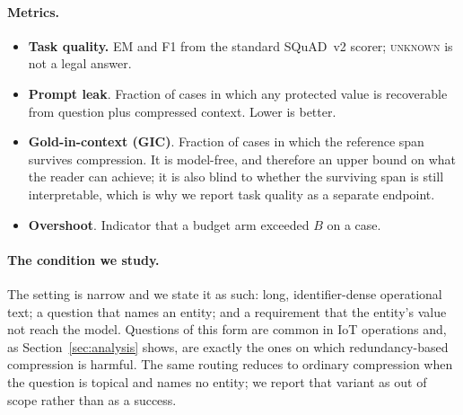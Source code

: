 \paragraph{Metrics.}
\begin{itemize}
\item \textbf{Task quality.} EM and F1 from the standard SQuAD~v2 scorer;
\textsc{unknown} is not a legal answer.
\item \textbf{Prompt leak}. Fraction of cases in which any protected value is recoverable
from question plus compressed context. Lower is better.
\item \textbf{Gold-in-context (GIC)}. Fraction of cases in which the reference span survives
compression. It is model-free, and therefore an upper bound on what the reader can achieve;
it is also blind to whether the surviving span is still interpretable, which is why we report
task quality as a separate endpoint.
\item \textbf{Overshoot}. Indicator that a budget arm exceeded $B$ on a case.
\end{itemize}

\paragraph{The condition we study.}
The setting is narrow and we state it as such: long, identifier-dense operational text; a
question that names an entity; and a requirement that the entity's value not reach the
model. Questions of this form are common in IoT operations and, as
Section~\ref{sec:analysis} shows, are exactly the ones on which redundancy-based compression
is harmful. The same routing reduces to ordinary compression when the question is topical
and names no entity; we report that variant as out of scope rather than as a success.
